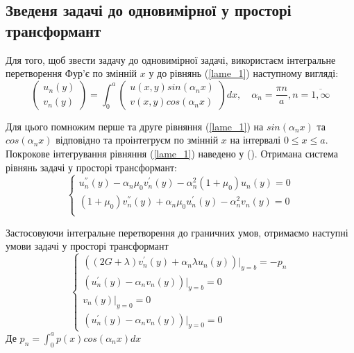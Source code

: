 \documentclass[a4paper,14pt]{extarticle}
\numberwithin{equation}{section}
\begin{document}
\subsection{Зведеня задачі до одновимірної у просторі трансформант}
Для того, щоб звести задачу до одновимірної задачі, використаєм інтегральне перетворення Фур'є по змінній $x$ у до рівнянь (\ref{lame_1}) наступному вигляді:
\begin{equation}
    \begin{pmatrix}
        u_n(y) \\
        v_n(y)
    \end{pmatrix} = \int_{0}^{a} 
    \begin{pmatrix}
        u(x,y) sin(\alpha_n x) \\
        v(x,y) cos(\alpha_n x)
    \end{pmatrix} dx, \quad \alpha_n = \frac{\pi n}{a}, n=\overline{1, \infty}
\end{equation}

Для цього помножим перше та друге рівняння (\ref{lame_1}) на $sin(\alpha_n x)$ та $cos(\alpha_n x)$ відповідно та проінтегруєм по змінній $x$ на інтервалі $0 \le x \le a$.
Покрокове інтегрування рівняння (\ref{lame_1}) наведено у ().
Отримана система рівнянь задачі у просторі трансформант:
\begin{equation}\label{transf_1}
    \begin{cases}
        u_n^{''}(y) - \alpha_n \mu_0 v_n^{'}(y) - \alpha_n^2 (1 + \mu_0) u_n(y) = 0 \\
        (1 + \mu_0) v_n^{''}(y) + \alpha_n \mu_0 u_n^{'}(y)  - \alpha_n^2 v_n(y) = 0 \\
    \end{cases}
\end{equation}

Застосовуючи інтегральне перетворення до граничних умов,
отримаємо наступні умови задачі у просторі трансформант
\begin{equation}\label{transf_bound_1}
    \begin{cases}
        \left( (2G + \lambda)v_n^{'}(y) + \alpha_n \lambda u_n(y) \right)|_{y=b} = -p_n \\
        \left(u_n^{'}(y) - \alpha_n v_n(y)  \right)|_{y=b} = 0 \\
        v_n(y)|_{y=0} = 0 \\
        \left(u_n^{'}(y) - \alpha_n v_n(y)  \right)|_{y=0} = 0
    \end{cases}
\end{equation}
Де $p_n = \int_{0}^{a} p(x) cos(\alpha_n x) dx$
\end{document}
